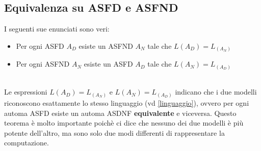 \subsection{Equivalenza su ASFD e ASFND}
\colorbox{SALZO}{\parbox{\dimexpr\linewidth-2\fboxsep}{\begin{theorem}
   I seguenti sue enunciati sono veri:
   \begin{itemize}
    \item Per ogni ASFD $A_D$ esiste un ASFND $A_N$ tale che $L(A_D) = L_(A_N)$
    \item Per ogni ASFND $A_N$ esiste un ASFD $A_D$ tale che $L(A_N) = L_(A_D)$
   \end{itemize}
\end{theorem}}}\smallskip\\
Le espressioni $L(A_D) = L_(A_N)$ e $L(A_N) = L_(A_D)$ indicano che i due modelli riconoscono esattamente lo stesso linguaggio (vd \ref{linguaggio}), ovvero per ogni automa ASFD esiste un
automa ASDNF \textbf{equivalente} e viceversa. Questo teorema è molto importante poichè ci dice che nessuno dei due modelli è più potente dell'altro, ma sono solo due modi differenti di rappresentare
la computazione.
